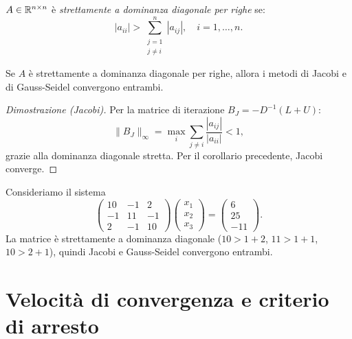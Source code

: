 \begin{definition}
$A \in \mathbb{R}^{n \times n}$ è \emph{strettamente a dominanza diagonale per righe} se:
\begin{equation}
  |a_{ii}| > \sum_{\substack{j=1 \\ j \neq i}}^n |a_{ij}|, \quad i = 1, \ldots, n.
  \label{eq:dom_diag}
\end{equation}
\end{definition}

\begin{theorem}
\label{thm:dom_diag}
Se $A$ è strettamente a dominanza diagonale per righe, allora i metodi di Jacobi e
di Gauss-Seidel convergono entrambi.
\end{theorem}

\begin{proof}[Dimostrazione (Jacobi)]
Per la matrice di iterazione $B_J = -D^{-1}(L+U)$:
\begin{equation}
  \|B_J\|_\infty = \max_i \sum_{j \neq i} \frac{|a_{ij}|}{|a_{ii}|} < 1,
\end{equation}
grazie alla dominanza diagonale stretta. Per il corollario precedente, Jacobi converge.
\end{proof}

\begin{example}
Consideriamo il sistema
\[
  \begin{pmatrix} 10 & -1 & 2 \\ -1 & 11 & -1 \\ 2 & -1 & 10 \end{pmatrix}
  \begin{pmatrix} x_1 \\ x_2 \\ x_3 \end{pmatrix}
  =
  \begin{pmatrix} 6 \\ 25 \\ -11 \end{pmatrix}.
\]
La matrice è strettamente a dominanza diagonale ($10 > 1+2$, $11 > 1+1$, $10 > 2+1$),
quindi Jacobi e Gauss-Seidel convergono entrambi.
\end{example}

\section{Velocità di convergenza e criterio di arresto}
\label{sec:stop}

